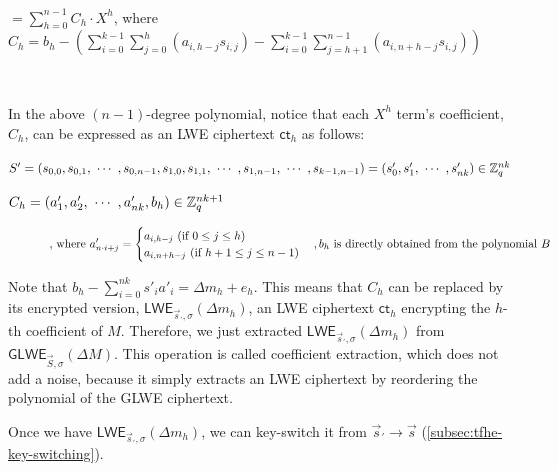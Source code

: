$ $

$= \sum\limits_{h=0}^{n-1}  C_h \cdot X^{h}  $, where $C_h = b_h - \left(  \sum\limits_{i=0}^{k-1} \sum\limits_{j=0}^{h}(a_{i,h-j}s_{i,j}) - \sum\limits_{i=0}^{k-1} \sum\limits_{j=h+1}^{n-1}(a_{i,n+h-j}s_{i,j})  \right)$

$ $

\noindent In the above $(n-1)$-degree polynomial, notice that each $X^h$ term's coefficient, $C_h$, can be expressed as an LWE ciphertext $\textsf{ct}_h$ as follows:

$S' = (s_{0,0}, s_{0,1}, \text{ } \text{$\cdots$} \text{ }, s_{0,n-1}, s_{1,0}, s_{1,1}, \text{ } \text{$\cdots$} \text{ }, s_{1, n-1}, \text{ } \text{$\cdots$} \text{ }, s_{k-1, n-1}) = (s'_0, s'_1, \text{ } \text{$\cdots$} \text{ }, s'_{nk} ) \in \mathbb{Z}_q^{nk}$


$C_h = (a'_1, a'_2, \text{ } \text{$\cdots$} \text{ }, a'_{nk}, b_h) \in \mathbb{Z}_q^{nk + 1}$


\begin{figure}[h]
\[
    \text{, where } a'_{n \cdot i + j} =   
\begin{cases}
    a_{i,h - j} \text{ (if } 0 \leq j \leq h\text{)}\\
    a_{i,n + h - j} \text{ (if } h+1 \leq j \leq n-1\text{)}\\
\end{cases}
\centering , b_h \text{ is directly obtained from the polynomial } B
\]
\end{figure}

\noindent Note that $b_h - \sum\limits_{i=0}^{nk}s'_ia'_i = \Delta m_h + e_h$. This means that $C_h$ can be replaced by its encrypted version, $\textsf{LWE}_{\vec{s}_{'}, \sigma}(\Delta m_h)$, an LWE ciphertext $\textsf{ct}_h$ encrypting the $h$-th coefficient of $M$. Therefore, we just extracted $\textsf{LWE}_{\vec{s}_{'}, \sigma}(\Delta m_h)$ from $\textsf{GLWE}_{\vec{S}, \sigma}(\Delta M)$. This operation is called coefficient extraction, which does not add a noise, because it simply extracts an LWE ciphertext by reordering the polynomial of the GLWE ciphertext. 

Once we have $\textsf{LWE}_{\vec{s}_{'}, \sigma}(\Delta m_h)$, we can key-switch it from $\vec{s}_{'} \rightarrow \vec{s}$ (\autoref{subsec:tfhe-key-switching}). 

